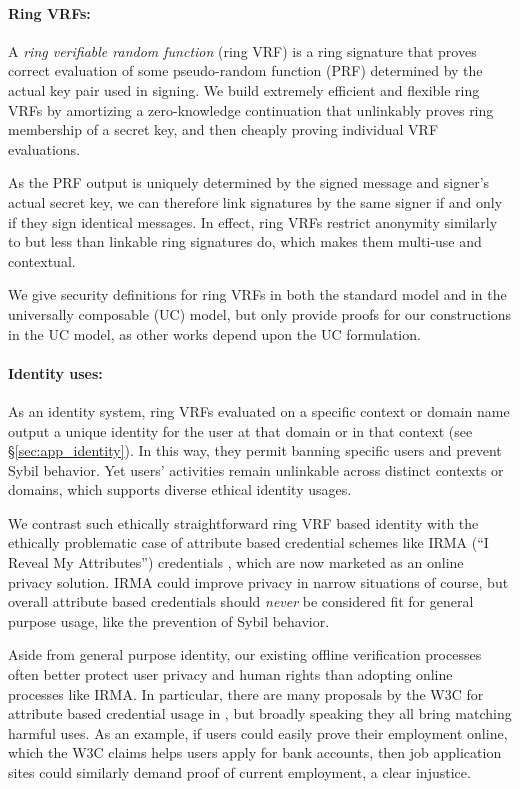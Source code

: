 \paragraph{Ring VRFs:}

A {\it ring verifiable random function} (ring VRF) is a ring signature
that proves correct evaluation of some pseudo-random function (PRF)
determined by the actual key pair used in signing. %
We build extremely efficient and flexible ring VRFs by amortizing a
zero-knowledge continuation that unlinkably proves ring membership
of a secret key, and then cheaply proving individual VRF evaluations.

As the PRF output is uniquely determined by the signed message and
signer's actual secret key, we can therefore link signatures by the
same signer if and only if they sign identical messages.
In effect, ring VRFs restrict anonymity similarly to but less than
 linkable ring signatures do, which makes them multi-use and contextual.

We give security definitions for ring VRFs in both the standard model
and in the universally composable (UC) \cite{canetti1,canetti2} model,
but only provide proofs for our constructions in the UC model, as other
works depend upon the UC formulation.

\paragraph{Identity uses:}

As an identity system, ring VRFs evaluated on a specific context or
domain name output a unique identity for the user at that domain or
in that context (see \S\ref{sec:app_identity}).  In this way, they
permit banning specific users and prevent Sybil behavior.
Yet users' activities remain unlinkable across distinct contexts or
domains, which supports diverse ethical identity usages.

We contrast such ethically straightforward ring VRF based identity
with the ethically problematic case of attribute based credential
schemes like IRMA (``I Reveal My Attributes'') credentials \cite{IRMAcredentials},
 which are now marketed as an online privacy solution.
IRMA could improve privacy in narrow situations of course, but
overall attribute based credentials should {\it never} be considered
fit for general purpose usage, like the prevention of Sybil behavior.

Aside from general purpose identity, our existing offline
verification processes often better protect user privacy and human
rights than adopting online processes like IRMA.
%
In particular, there are many proposals by the W3C for attribute based
credential usage in \cite{w3c_vc_use_cases}, but broadly speaking they
all bring matching harmful uses.  %
As an example, if users could easily prove their employment online, which
the W3C claims helps users apply for bank accounts, then job application
sites could similarly demand proof of current employment, a clear injustice.

